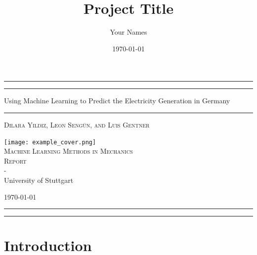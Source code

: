 \documentclass[11pt,table]{article}
\title{Project Title}
\author{Your Names}
\date{\today}
\begin{document}
\begin{titlepage} 
	\centering 
	\rule{\textwidth}{1pt} 
	\vspace{2pt}\vspace{-\baselineskip} 
	\rule{\textwidth}{0.4pt} 
	\vspace{0.1\textheight} 
	
	
	{\Huge Using Machine Learning to Predict the Electricity Generation in Germany}\\[0.5\baselineskip] 
	
	
	\vspace{0.025\textheight} 
	\rule{0.3\textwidth}{0.4pt} 
	\vspace{0.1\textheight}
	
	{\Large \textsc{Dilara Yildiz, Leon Sengün, and Luis Gentner}} 
	
	\vfill 
	
	\texttt{[image: example\_cover.png]} \\
	\vspace{0.05\textheight}
	{\large\textsc{Machine Learning Methods in Mechanics \\Report}\\ -\\ University of Stuttgart} 
	
	
	\vspace{0.1\textheight} 
	
	{\normalsize \today}
	
	
	\rule{\textwidth}{0.4pt}
	\vspace{2pt}\vspace{-\baselineskip}
	\rule{\textwidth}{1pt}
	
\end{titlepage}


\newpage

\tableofcontents

\newpage


\section{Introduction}
\end{document}
